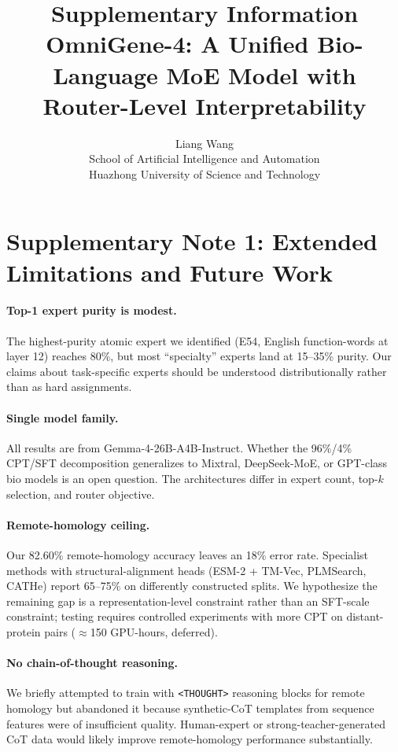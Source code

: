 \documentclass[11pt]{article}
\title{\textbf{Supplementary Information}\\
\large OmniGene-4: A Unified Bio-Language MoE Model with Router-Level Interpretability}
\author{Liang Wang\\
\small School of Artificial Intelligence and Automation\\
\small Huazhong University of Science and Technology}
\date{}
\begin{document}
\maketitle
\tableofcontents
\newpage

\section{Supplementary Note 1: Extended Limitations and Future Work}

\paragraph{Top-1 expert purity is modest.} The highest-purity atomic expert we identified (E54, English function-words at layer 12) reaches 80\%, but most ``specialty'' experts land at 15--35\% purity. Our claims about task-specific experts should be understood distributionally rather than as hard assignments.

\paragraph{Single model family.} All results are from Gemma-4-26B-A4B-Instruct. Whether the 96\%/4\% CPT/SFT decomposition generalizes to Mixtral, DeepSeek-MoE, or GPT-class bio models is an open question. The architectures differ in expert count, top-$k$ selection, and router objective.

\paragraph{Remote-homology ceiling.} Our 82.60\% remote-homology accuracy leaves an 18\% error rate. Specialist methods with structural-alignment heads (ESM-2 + TM-Vec, PLMSearch, CATHe) report 65--75\% on differently constructed splits. We hypothesize the remaining gap is a representation-level constraint rather than an SFT-scale constraint; testing requires controlled experiments with more CPT on distant-protein pairs ($\approx$150 GPU-hours, deferred).

\paragraph{No chain-of-thought reasoning.} We briefly attempted to train with \texttt{<THOUGHT>} reasoning blocks for remote homology but abandoned it because synthetic-CoT templates from sequence features were of insufficient quality. Human-expert or strong-teacher-generated CoT data would likely improve remote-homology performance substantially.
\end{document}
